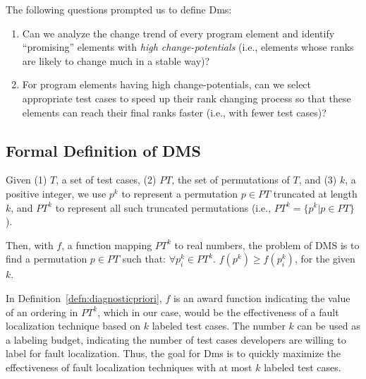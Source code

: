 The following questions prompted us to define {\sc Dms}:

\begin{enumerate}
\item Can we analyze the change trend of every program element and identify ``promising'' elements with {\em high change-potentials} (i.e., elements whose ranks are likely to change much in a stable way)?
\item For program elements having high change-potentials, can we select appropriate test cases to speed up their rank changing process so that these elements can reach their final ranks faster (i.e., with fewer test cases)?
\end{enumerate}

\subsection{Formal Definition of DMS}

\begin{definition}
Given (1) $T$, a set of test cases, (2) $PT$, the set of permutations of $T$, and (3) $k$, a positive integer, we use $p^k$ to represent a permutation $p\in PT$ truncated at length $k$, and $PT^k$ to represent all such truncated permutations (i.e., $PT^k=\{p^k|p\in PT\}$).

Then, with $f$, a function mapping $PT^k$ to real numbers, the problem of DMS is to find a permutation $p \in PT$ such that:
	$\forall{p_i^{k} \in PT^{k}}.$	$f(p^{k}) \geq f(p_i^{k})$, for the given $k$.
\label{defn:diagnosticpriori}
\end{definition}

In Definition~\ref{defn:diagnosticpriori}, $f$ is an award function indicating the value of an ordering in $PT^{k}$, which in our case, would be the effectiveness of a fault localization technique based on $k$ labeled test cases.
The number $k$ can be used as a labeling budget, indicating the number of test cases developers are willing to label for fault localization.
Thus, the goal for {\sc Dms} is to quickly maximize the effectiveness of fault localization techniques with at most $k$ labeled test cases.
